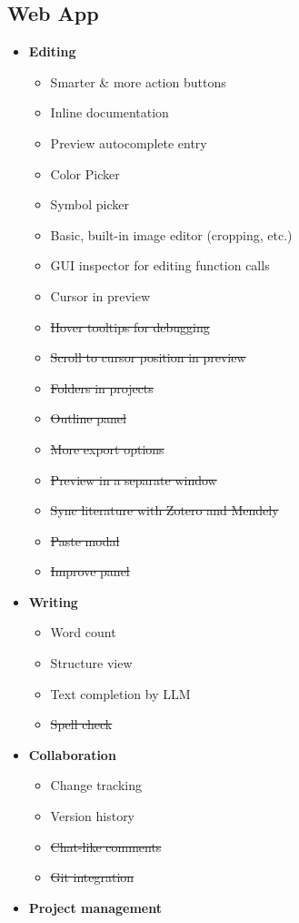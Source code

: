 \subsection{Web App}\label{web-app}

\begin{itemize}
\item
  \textbf{Editing}

  \begin{itemize}
  \tightlist
  \item
    Smarter \& more action buttons
  \item
    Inline documentation
  \item
    Preview autocomplete entry
  \item
    Color Picker
  \item
    Symbol picker
  \item
    Basic, built-in image editor (cropping, etc.)
  \item
    GUI inspector for editing function calls
  \item
    Cursor in preview
  \item
    \st{Hover tooltips for debugging}
  \item
    \st{Scroll to cursor position in preview}
  \item
    \st{Folders in projects}
  \item
    \st{Outline panel}
  \item
    \st{More export options}
  \item
    \st{Preview in a separate window}
  \item
    \st{Sync literature with Zotero and Mendely}
  \item
    \st{Paste modal}
  \item
    \st{Improve panel}
  \end{itemize}
\item
  \textbf{Writing}

  \begin{itemize}
  \tightlist
  \item
    Word count
  \item
    Structure view
  \item
    Text completion by LLM
  \item
    \st{Spell check}
  \end{itemize}
\item
  \textbf{Collaboration}

  \begin{itemize}
  \tightlist
  \item
    Change tracking
  \item
    Version history
  \item
    \st{Chat-like comments}
  \item
    \st{Git integration}
  \end{itemize}
\item
  \textbf{Project management}


\end{itemize}

